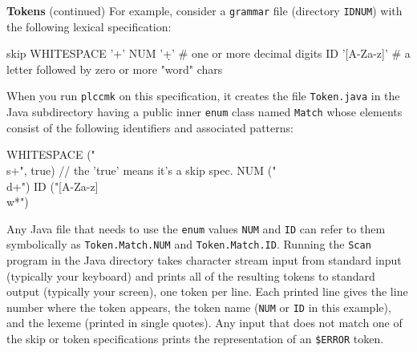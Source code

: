 \begin{minipage}[t]{\sw}
\slidenumber
\LARGE
{\bf Tokens} (continued)\exx
For example, consider a \verb'grammar' file
(directory {\color{red}\verb'IDNUM'})
with the following lexical specification:
{\Large
\begin{qv}
skip WHITESPACE '\s+'
NUM '\d+'        # one or more decimal digits
ID '[A-Za-z]\w*' # a letter followed by zero or more "word" chars
\end{qv}
}
When you run \verb'plccmk' on this specification,
it creates the file \verb'Token.java' in the Java subdirectory
having a public inner \verb'enum' class named \verb'Match'
whose elements consist of the following identifiers
and associated patterns:
{\Large
\begin{qv}
WHITESPACE ("\\s+", true) // the 'true' means it's a skip spec.
NUM ("\\d+")
ID ("[A-Za-z]\\w*")
\end{qv}
}
Any Java file that needs
to use the \verb'enum' values \verb'NUM' and \verb'ID' can refer
to them symbolically as \verb'Token.Match.NUM' and \verb'Token.Match.ID'.\exx
Running the \verb'Scan' program in the Java directory
takes character stream input from standard input
(typically your keyboard)
and prints all of the resulting tokens to standard output
(typically your screen),
one token per line.
Each printed line gives the line number where the token appears,
the token name (\verb'NUM' or \verb'ID' in this example),
and the lexeme (printed in single quotes).
Any input that does not match one of the skip or token specifications
prints the representation of an \verb'$ERROR' token.
\end{minipage}
\clearpage
